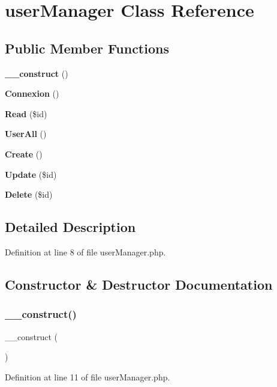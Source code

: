 \section{user\+Manager Class Reference}
\label{class_src_1_1_managers_1_1user_manager}
\subsection*{Public Member Functions}
\begin{DoxyCompactItemize}
\item 
\textbf{ \+\_\+\+\_\+construct} ()
\item 
\textbf{ Connexion} ()
\item 
\textbf{ Read} (\$id)
\item 
\textbf{ User\+All} ()
\item 
\textbf{ Create} ()
\item 
\textbf{ Update} (\$id)
\item 
\textbf{ Delete} (\$id)
\end{DoxyCompactItemize}


\subsection{Detailed Description}


Definition at line 8 of file user\+Manager.\+php.



\subsection{Constructor \& Destructor Documentation}
\mbox{\label{class_src_1_1_managers_1_1user_manager_a095c5d389db211932136b53f25f39685}} 
\subsubsection{\+\_\+\+\_\+construct()}
{\footnotesize\ttfamily \+\_\+\+\_\+construct (\begin{DoxyParamCaption}{ }\end{DoxyParamCaption})}



Definition at line 11 of file user\+Manager.\+php.



